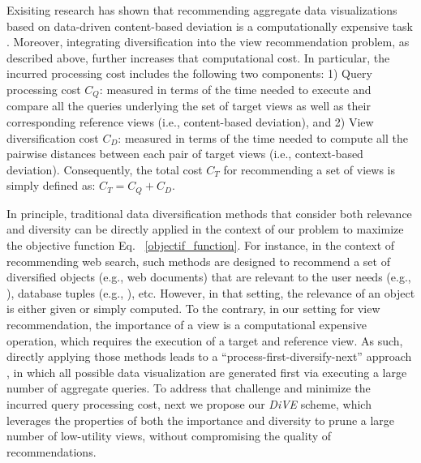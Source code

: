 Exisiting research has shown that recommending aggregate data visualizations based on data-driven content-based deviation is a computationally expensive task \cite{Vartak2014, Vartak2015, Ehsan2016}.
%
Moreover, integrating diversification into the view recommendation problem, as described above, further increases that computational cost.
%
In particular, the incurred processing cost includes the following two components: 1) Query processing cost $C_Q$: measured in terms of the time needed to execute and compare all the queries underlying the set of target views as well as their corresponding reference views (i.e., content-based deviation), and 2) View diversification cost $C_D$: measured in terms of the time needed to compute all the pairwise distances between each pair of target views (i.e., context-based deviation).
%
Consequently, the total cost $C_T$ for recommending a set of views is simply defined as: $C_T= C_Q + C_D$.

In principle, traditional data diversification methods that consider both relevance and diversity can be directly applied in the context of our problem to maximize the objective function Eq. ~\ref{objectif_function}.
%
For instance, in the context of recommending web search, such methods are designed to recommend a set of diversified objects (e.g., web documents) that are relevant to the user needs (e.g., \cite{ Clarke2008,Rafiei2010, Zhang2008}), database tuples (e.g., \cite{DBLP:conf/sigmod/TranC10}), etc. 
%
However, in that setting, the relevance of an object is either given or simply computed.
%
To the contrary, in our setting for view recommendation, the importance of a view is a computational expensive operation, which requires the execution of a target and reference view. 
%
As such, directly applying those methods leads to a ``process-first-diversify-next'' approach \cite{Khan2015}, in which all possible data visualization are generated first via executing a large number of aggregate queries. 
%
To address that challenge and minimize the incurred query processing cost, next we propose our {\em DiVE} scheme, which leverages the properties of both the importance and diversity to prune a large number of low-utility views, without compromising the quality of recommendations. 











